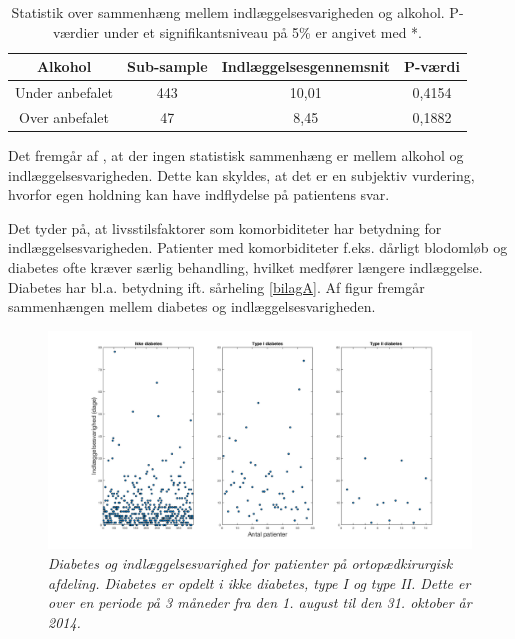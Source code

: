 \begin{table}[H]
\centering
\begin{tabular}{|c|c|c|c|}
\hline
\textbf{Alkohol} & \textbf{Sub-sample} & \textbf{Indlæggelsesgennemsnit} & \textbf{P-værdi} \\ \hline
Under anbefalet   & 443                 & 10,01                           & 0,4154           \\ \hline
Over anbefalet    & 47                  & 8,45                            & 0,1882           \\ \hline
\end{tabular}
\caption{Statistik over sammenhæng mellem indlæggelsesvarigheden og alkohol. P-værdier under et signifikantsniveau på 5\% er angivet med *.}
\label{alkoholindlaegtab}
\end{table}

\noindent
Det fremgår af , at der ingen statistisk sammenhæng er mellem alkohol og indlæggelsesvarigheden. Dette kan skyldes, at det er en subjektiv vurdering, hvorfor egen holdning kan have indflydelse på patientens svar. 

Det tyder på, at livsstilsfaktorer som komorbiditeter har betydning for indlæggelsesvarigheden. Patienter med komorbiditeter f.eks. dårligt blodomløb og diabetes ofte kræver særlig behandling, hvilket medfører længere indlæggelse. Diabetes har bl.a. betydning ift. sårheling \ref{bilagA}. Af figur  fremgår sammenhængen mellem diabetes og indlæggelsesvarigheden. 

\begin{figure}[H]
	\centering
	\includegraphics[scale=0.25]{figures/diabetesogindlaeg}
	\caption{\textit{Diabetes og indlæggelsesvarighed for patienter på ortopædkirurgisk afdeling. Diabetes er opdelt i ikke diabetes, type I og type II. Dette er over en periode på 3 måneder fra den 1. august til den 31. oktober år 2014. }}
	\label{diabetesogindlaeggelse}
\end{figure}

